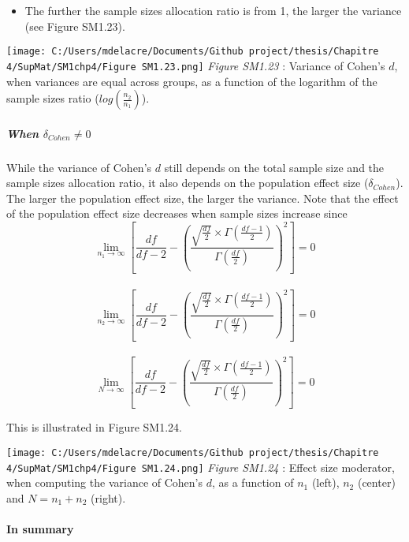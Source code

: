 \documentclass[
  english,
  man,mask,floatsintext]{apa6}
\providecommand{\tightlist}{%
  \setlength{\itemsep}{0pt}\setlength{\parskip}{0pt}}
\let\oldparagraph\paragraph
\renewcommand{\paragraph}[1]{\oldparagraph{#1}\mbox{}}
\let\oldsubparagraph\subparagraph
\renewcommand{\subparagraph}[1]{\oldsubparagraph{#1}\mbox{}}
\begin{document}
\newpage

\begin{itemize}
\tightlist
\item
  The further the sample sizes allocation ratio is from 1, the larger the variance (see Figure SM1.23).
\end{itemize}

\texttt{[image: C:/Users/mdelacre/Documents/Github project/thesis/Chapitre 4/SupMat/SM1chp4/Figure SM1.23.png]}
\emph{Figure SM1.23} : Variance of Cohen's \(d\), when variances are equal across groups, as a function of the logarithm of the sample sizes ratio (\(log\left(\frac{n_2}{n_1} \right)\)).

\hypertarget{when-delta_cohenneq-0}{%
\subparagraph{\texorpdfstring{When \(\delta_{Cohen}\neq 0\)}{When \textbackslash delta\_\{Cohen\}\textbackslash neq 0}}\label{when-delta_cohenneq-0}}

While the variance of Cohen's \(d\) still depends on the total sample size and the sample sizes allocation ratio, it also depends on the population effect size (\(\delta_{Cohen}\)). The larger the population effect size, the larger the variance. Note that the effect of the population effect size decreases when sample sizes increase since
\[\lim_{n_1\rightarrow \infty}\left[\frac{df}{df-2} - \left( \frac{\sqrt{\frac{df}{2}} \times \Gamma \left(\frac{df-1}{2} \right)}{\Gamma \left( \frac{df}{2}\right)}\right)^2 \right]=0\]\\
\[\lim_{n_2\rightarrow \infty}\left[\frac{df}{df-2} - \left( \frac{\sqrt{\frac{df}{2}} \times \Gamma \left(\frac{df-1}{2} \right)}{\Gamma \left( \frac{df}{2}\right)}\right)^2 \right]=0\]\\
\[\lim_{N\rightarrow \infty}\left[\frac{df}{df-2} - \left( \frac{\sqrt{\frac{df}{2}} \times \Gamma \left(\frac{df-1}{2} \right)}{\Gamma \left( \frac{df}{2}\right)}\right)^2 \right]=0\]

This is illustrated in Figure SM1.24.

\texttt{[image: C:/Users/mdelacre/Documents/Github project/thesis/Chapitre 4/SupMat/SM1chp4/Figure SM1.24.png]}
\emph{Figure SM1.24} : Effect size moderator, when computing the variance of Cohen's \(d\), as a function of \(n_1\) (left), \(n_2\) (center) and \(N=n_1+n_2\) (right).

\hypertarget{in-summary-1}{%
\paragraph{In summary}\label{in-summary-1}}
\end{document}
